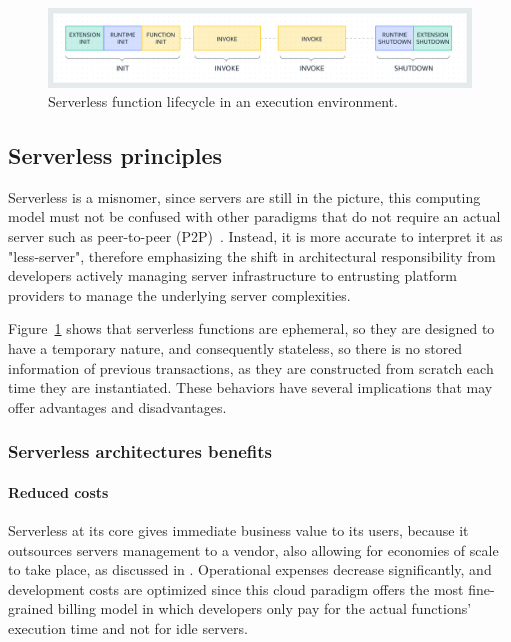 \begin{figure}[H]
  \centering
  \includegraphics[width=\textwidth]{diagrams/lambda.png}
  \caption{Serverless function lifecycle in an execution environment.}
  \label{fig:serverless-functions-lifecycle}
\end{figure}

\subsection{Serverless principles}

Serverless is a misnomer, since servers are still in the picture,
this computing model must not be confused with other paradigms
that do not require an actual server such as peer-to-peer (P2P)~\cite{serverless-wikipedia}.
Instead, it is more accurate to interpret it as "less-server",
therefore emphasizing the shift in architectural responsibility from developers actively
managing server infrastructure to entrusting platform providers to manage the underlying server complexities.

Figure~\ref{fig:serverless-functions-lifecycle} shows that serverless functions
are ephemeral, so they are designed to have a temporary nature, and consequently
stateless, so there is no stored information of previous transactions, as they are constructed
from scratch each time they are instantiated.
These behaviors have several implications that may offer advantages and disadvantages.

\subsubsection{Serverless architectures benefits}

\paragraph{\textbf{Reduced costs}} Serverless at its core gives immediate
business value to its users, because it outsources servers management
to a vendor, also allowing for economies of scale to take place, as discussed in \cite{berkeley}.
Operational expenses decrease significantly, and development costs are optimized
since this cloud paradigm offers the most fine-grained billing model in which developers
only pay for the actual functions' execution time and not for idle servers.

